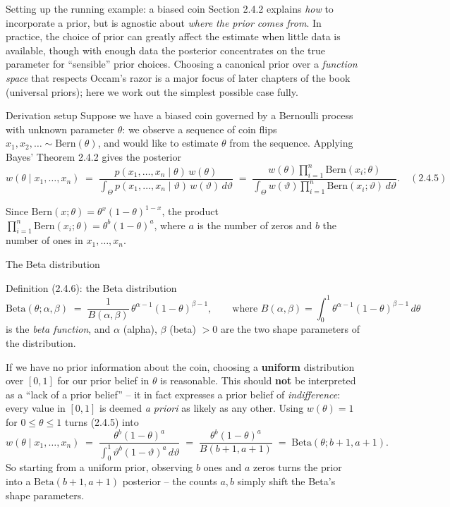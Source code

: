 \documentclass[aspectratio=169,10pt]{beamer}
\begin{document}
\begin{frame}{Setting up the running example: a biased coin}
  Section 2.4.2 explains \emph{how} to incorporate a prior, but is agnostic
  about \emph{where the prior comes from}. In practice, the choice of prior
  can greatly affect the estimate when little data is available, though with
  enough data the posterior concentrates on the true parameter for
  ``sensible'' prior choices. Choosing a canonical prior over a
  \emph{function space} that respects Occam's razor is a major focus of
  later chapters of the book (universal priors); here we work out the
  simplest possible case fully.

  \begin{block}{Derivation setup}
    Suppose we have a biased coin governed by a Bernoulli process with
    unknown parameter $\theta$: we observe a sequence of coin flips
    $x_1,x_2,\ldots\sim\mathrm{Bern}(\theta)$, and would like to estimate
    $\theta$ from the sequence. Applying Bayes' Theorem 2.4.2 gives the
    posterior
    \[
      w(\theta\mid x_1,\ldots,x_n) \;=\; \frac{p(x_1,\ldots,x_n\mid\theta)\,w(\theta)}
        {\int_\Theta p(x_1,\ldots,x_n\mid\vartheta)\,w(\vartheta)\,d\vartheta}
      \;=\; \frac{w(\theta)\prod_{i=1}^n\mathrm{Bern}(x_i;\theta)}
        {\int_\Theta w(\vartheta)\prod_{i=1}^n\mathrm{Bern}(x_i;\vartheta)\,d\vartheta}.\quad(2.4.5)
    \]
  \end{block}
  Since $\mathrm{Bern}(x;\theta)=\theta^x(1-\theta)^{1-x}$, the product
  $\prod_{i=1}^n\mathrm{Bern}(x_i;\theta)=\theta^b(1-\theta)^a$, where $a$ is
  the number of zeros and $b$ the number of ones in $x_1,\ldots,x_n$.
\end{frame}

\begin{frame}{The Beta distribution}
  \begin{block}{Definition (2.4.6): the Beta distribution}
    \[
      \mathrm{Beta}(\theta;\alpha,\beta) \;=\; \frac{1}{B(\alpha,\beta)}\,\theta^{\alpha-1}(1-\theta)^{\beta-1},
      \qquad \text{where } B(\alpha,\beta)=\int_0^1\theta^{\alpha-1}(1-\theta)^{\beta-1}\,d\theta
    \]
    is the \emph{beta function}, and $\alpha$ (alpha), $\beta$ (beta) $>0$
    are the two shape parameters of the distribution.
  \end{block}

  If we have no prior information about the coin, choosing a
  \textbf{uniform} distribution over $[0,1]$ for our prior belief in
  $\theta$ is reasonable. This should \textbf{not} be interpreted as a
  ``lack of a prior belief'' -- it in fact expresses a prior belief of
  \emph{indifference}: every value in $[0,1]$ is deemed \emph{a priori} as
  likely as any other. Using $w(\theta)=1$ for $0\le\theta\le 1$ turns
  (2.4.5) into
  \[
    w(\theta\mid x_1,\ldots,x_n) \;=\; \frac{\theta^b(1-\theta)^a}{\int_0^1\vartheta^b(1-\vartheta)^a\,d\vartheta}
    \;=\; \frac{\theta^b(1-\theta)^a}{B(b+1,a+1)} \;=\; \mathrm{Beta}(\theta;b+1,a+1).
  \]
  So starting from a uniform prior, observing $b$ ones and $a$ zeros turns
  the prior into a $\mathrm{Beta}(b+1,a+1)$ posterior -- the counts $a,b$
  simply shift the Beta's shape parameters.
\end{frame}
\end{document}
